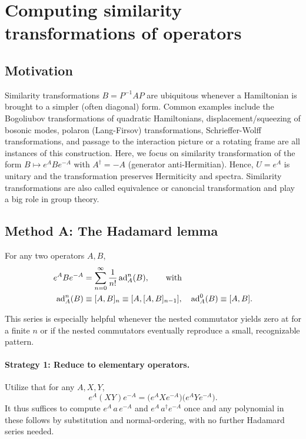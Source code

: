 \documentclass[../../main.tex]{subfiles}
\begin{document}
\section{Computing similarity transformations of operators}
\label{sec:similarity-transformations}

\subsection{Motivation}

Similarity transformations $B = P^{-1} A P$ are ubiquitous whenever a Hamiltonian is
brought to a simpler (often diagonal) form. Common examples include the Bogoliubov transformations of quadratic
Hamiltonians, displacement/squeezing of bosonic modes, polaron (Lang-Firsov)
transformations, Schrieffer-Wolff transformations, and passage to the interaction
picture or a rotating frame are all instances of this construction. Here, we focus on similarity transformation of the form $B\mapsto e^{A}Be^{-A}$ with $A^\dagger=-A$ (generator anti-Hermitian). Hence, $U=e^{A}$ is unitary and the transformation preserves Hermiticity and spectra. Similarity transformations are also called equivalence or canoncial transformation and play a big role in group theory. 

\subsection{Method A: The Hadamard lemma}

\begin{lemma*}
For any two operators $A,B$,
\begin{align}
e^{A}Be^{-A} &= \sum_{n=0}^{\infty}\frac{1}{n!}\,\mathrm{ad}_A^n(B),\qquad \text{with} \\
\mathrm{ad}_A^n(B) &\equiv [A,B]_{n} \equiv [A, [A,B]_{n-1}] ,\quad \mathrm{ad}_A^0(B)\equiv[A,B] .
\end{align}
\end{lemma*}

This series is especially helpful whenever the nested commutator yields zero at for a finite $n$ or if the nested commutators eventually reproduce a small, recognizable pattern.

\paragraph{Strategy 1: Reduce to elementary operators.}
Utilize that for any $A,X,Y$,
\begin{equation}
e^{A}(XY)e^{-A}=\big(e^{A}Xe^{-A}\big)\big(e^{A}Ye^{-A}\big).
\end{equation}
It thus suffices to compute $e^{A}\,a\,e^{-A}$ and $e^{A}\,a^\dagger e^{-A}$ once and any
polynomial in these follows by substitution and normal-ordering, with no further
Hadamard series needed.
\end{document}
